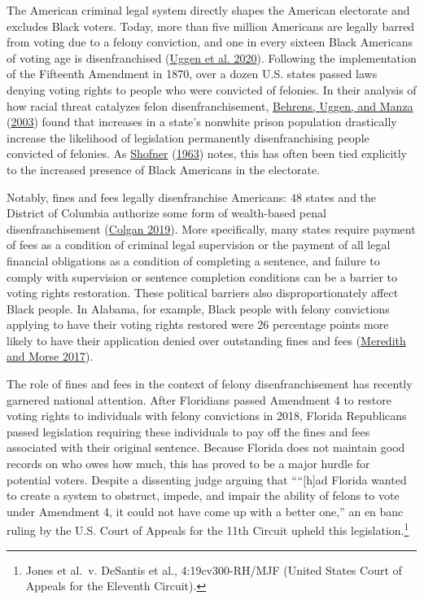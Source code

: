 \documentclass[
  12pt,
]{article}
\begin{document}
The American criminal legal system directly shapes the American electorate and excludes Black voters. Today, more than five million Americans are legally barred from voting due to a felony conviction, and one in every sixteen Black Americans of voting age is disenfranchised (\protect\hyperlink{ref-Uggen2020}{Uggen et al. 2020}). Following the implementation of the Fifteenth Amendment in 1870, over a dozen U.S. states passed laws denying voting rights to people who were convicted of felonies. In their analysis of how racial threat catalyzes felon disenfranchisement, \protect\hyperlink{ref-Behrens2003}{Behrens, Uggen, and Manza} (\protect\hyperlink{ref-Behrens2003}{2003}) found that increases in a state's nonwhite prison population drastically increase the likelihood of legislation permanently disenfranchising people convicted of felonies. As \protect\hyperlink{ref-Shofner1963}{Shofner} (\protect\hyperlink{ref-Shofner1963}{1963}) notes, this has often been tied explicitly to the increased presence of Black Americans in the electorate.

Notably, fines and fees legally disenfranchise Americans: 48 states and the District of Columbia authorize some form of wealth-based penal disenfranchisement (\protect\hyperlink{ref-Colgan2019}{Colgan 2019}). More specifically, many states require payment of fees as a condition of criminal legal supervision or the payment of all legal financial obligations as a condition of completing a sentence, and failure to comply with supervision or sentence completion conditions can be a barrier to voting rights restoration. These political barriers also disproportionately affect Black people. In Alabama, for example, Black people with felony convictions applying to have their voting rights restored were 26 percentage points more likely to have their application denied over outstanding fines and fees (\protect\hyperlink{ref-Meredith2017}{Meredith and Morse 2017}).

The role of fines and fees in the context of felony disenfranchisement has recently garnered national attention. After Floridians passed Amendment 4 to restore voting rights to individuals with felony convictions in 2018, Florida Republicans passed legislation requiring these individuals to pay off the fines and fees associated with their original sentence. Because Florida does not maintain good records on who owes how much, this has proved to be a major hurdle for potential voters. Despite a dissenting judge arguing that ````{[}h{]}ad Florida wanted to create a system to obstruct, impede, and impair the ability of felons to vote under Amendment 4, it could not have come up with a better one,'' an en banc ruling by the U.S. Court of Appeals for the 11th Circuit upheld this legislation.\footnote{Jones et al.~v. DeSantis et al., 4:19cv300-RH/MJF (United States Court of Appeals for the Eleventh Circuit).}
\end{document}
